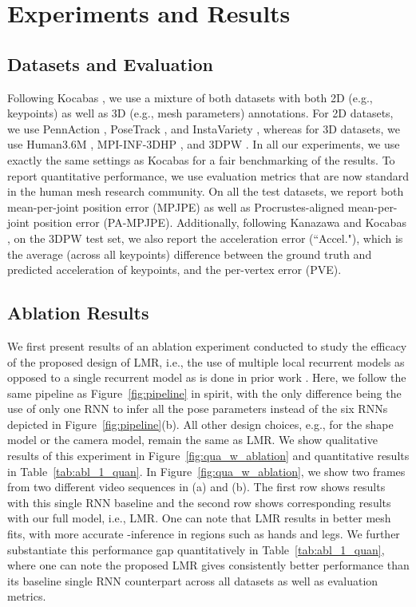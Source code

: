 \documentclass[10pt,twocolumn,letterpaper]{article}
\begin{document}
\section{Experiments and Results}

\subsection{Datasets and Evaluation} 
Following Kocabas \etal \cite{kocabas2019vibe}, we use a mixture of both datasets with both 2D (e.g., keypoints) as well as 3D (e.g., mesh parameters) annotations. For 2D datasets, we use PennAction \cite{Zhang_2013_ICCV}, PoseTrack \cite{PoseTrack}, and InstaVariety \cite{humanMotionKanazawa19}, whereas for 3D datasets, we use Human3.6M \cite{ionescu2013human3}, MPI-INF-3DHP \cite{mehta2017monocular}, and 3DPW \cite{von2018recovering}. In all our experiments, we use exactly the same settings as Kocabas \etal \cite{kocabas2019vibe} for a fair benchmarking of the results. To report quantitative performance, we use evaluation metrics that are now standard in the human mesh research community. On all the test datasets, we report both mean-per-joint position error (MPJPE) as well as Procrustes-aligned mean-per-joint position error (PA-MPJPE). Additionally, following Kanazawa \etal \cite{humanMotionKanazawa19} and Kocabas \etal \cite{kocabas2019vibe}, on the 3DPW test set, we also report the acceleration error (``Accel."), which is the average (across all keypoints) difference between the ground truth and predicted acceleration of keypoints, and the per-vertex error (PVE). 

\subsection{Ablation Results}
We first present results of an ablation experiment conducted to study the efficacy of the proposed design of LMR, i.e., the use of multiple local recurrent models as opposed to a single recurrent model as is done in prior work \cite{kocabas2019vibe}. Here, we follow the same pipeline as Figure~\ref{fig:pipeline} in spirit, with the only difference being the use of only one RNN to infer all the pose parameters  instead of the six RNNs depicted in Figure~\ref{fig:pipeline}(b). All other design choices, e.g., for the shape model or the camera model, remain the same as LMR. We show qualitative results of this experiment in Figure~\ref{fig:qua_w_ablation} and quantitative results in Table~\ref{tab:abl_1_quan}. In Figure~\ref{fig:qua_w_ablation}, we show two frames from two different video sequences in (a) and (b). The first row shows results with this single RNN baseline and the second row shows corresponding results with our full model, i.e., LMR. One can note that LMR results in better mesh fits, with more accurate -inference in regions such as hands and legs. We further substantiate this performance gap quantitatively in Table~\ref{tab:abl_1_quan}, where one can note the proposed LMR gives consistently better performance than its baseline single RNN counterpart across all datasets as well as evaluation metrics. 
\end{document}

